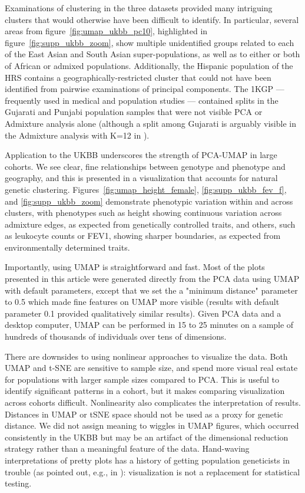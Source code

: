 \documentclass[12pt]{pnas-new}
\begin{document}
Examinations of clustering in the three datasets provided many intriguing clusters that would otherwise have been difficult to identify. In particular, several areas from figure~\ref{fig:umap_ukbb_pc10}, highlighted in figure~\ref{fig:supp_ukbb_zoom}, show multiple unidentified groups related to each of the East Asian and South Asian super-populations, as well as to either or both of African or admixed populations. Additionally, the Hispanic population of the HRS contains a geographically-restricted cluster that could not have been identified from pairwise examinations of principal components. The 1KGP --- frequently used in medical and population studies --- contained splits in the Gujarati and Punjabi population samples that were not visible PCA or Admixture analysis alone (although a split among Gujarati is arguably visible in the Admixture analysis with K=12 in \cite{10002015global}). 

Application to the UKBB underscores the strength of PCA-UMAP in large cohorts. We see clear, fine relationships between genotype and phenotype and geography, and this is presented in a visualization that accounts for natural genetic clustering. Figures~\ref{fig:umap_height_female}, \ref{fig:supp_ukbb_fev_f}, and \ref{fig:supp_ukbb_zoom} demonstrate phenotypic variation within and across clusters, with phenotypes such as height showing continuous variation across admixture edges, as expected from genetically controlled traits, and others, such as leukocyte counts or FEV1, showing sharper boundaries, as expected from environmentally determined traits.  

Importantly, using UMAP is straightforward and fast. Most of the plots presented in this article were generated directly from the PCA data using UMAP with default parameters, except that we set the a "minimum distance" parameter to 0.5 which made fine features on UMAP more visible (results with default parameter 0.1 provided qualitatively similar results). Given PCA data and a desktop computer, UMAP can be performed in 15 to 25 minutes on a sample of hundreds of thousands of individuals over tens of dimensions. 

There are downsides to using nonlinear approaches to visualize the data. Both UMAP and t-SNE are sensitive to sample size, and spend more visual real estate for populations with larger sample sizes compared to PCA. This is useful to identify significant patterns in a cohort, but it makes comparing visualization across cohorts difficult. Nonlinearity also complicates the interpretation of results. Distances in UMAP or tSNE space should not be used as a proxy for genetic distance. We did not assign meaning to wiggles in UMAP figures, which occurred consistently in the UKBB but may be an artifact of the dimensional reduction strategy rather than a meaningful feature of the data. Hand-waving interpretations of pretty plots has a history of getting population geneticists in trouble (as pointed out, e.g., in \cite{novembre2008interpreting}): visualization is not a replacement for statistical testing.       
\end{document}
